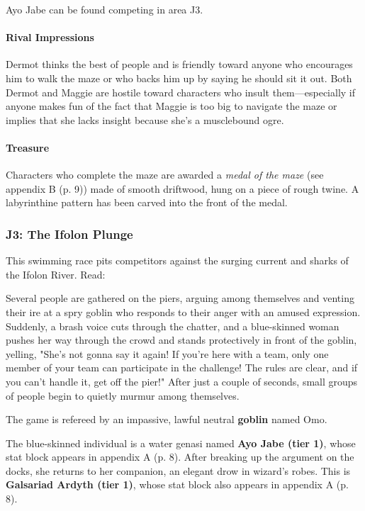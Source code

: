 \documentclass[a4paper, 11pt, bg=full, twocolumn, nooutline]{dndbook}
\begin{document}

Ayo Jabe can be found competing in area J3.

\paragraph{Rival Impressions}

Dermot thinks the best of people and is friendly toward anyone who encourages him to walk the maze or who backs him up by saying he should sit it out. Both Dermot and Maggie are hostile toward characters who insult them---especially if anyone makes fun of the fact that Maggie is too big to navigate the maze or implies that she lacks insight because she's a musclebound ogre.

\paragraph{Treasure}

Characters who complete the maze are awarded a \textit{medal of the maze} (see appendix B (p. 9)) made of smooth driftwood, hung on a piece of rough twine. A labyrinthine pattern has been carved into the front of the medal.

\subsubsection{J3: The Ifolon Plunge}

This swimming race pits competitors against the surging current and sharks of the Ifolon River. Read:

\begin{DndReadAloud}
Several people are gathered on the piers, arguing among themselves and venting their ire at a spry goblin who responds to their anger with an amused expression. Suddenly, a brash voice cuts through the chatter, and a blue-skinned woman pushes her way through the crowd and stands protectively in front of the goblin, yelling, "She's not gonna say it again! If you're here with a team, only one member of your team can participate in the challenge! The rules are clear, and if you can't handle it, get off the pier!" After just a couple of seconds, small groups of people begin to quietly murmur among themselves.
\end{DndReadAloud}

The game is refereed by an impassive, lawful neutral \textbf{goblin} named Omo.

The blue-skinned individual is a water genasi named \textbf{Ayo Jabe (tier 1)}, whose stat block appears in appendix A (p. 8). After breaking up the argument on the docks, she returns to her companion, an elegant drow in wizard's robes. This is \textbf{Galsariad Ardyth (tier 1)}, whose stat block also appears in appendix A (p. 8).
\end{document}
